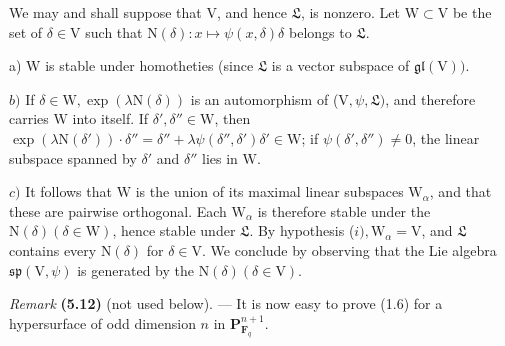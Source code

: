 \documentclass[10pt,leqno]{article}
\begin{document}
\par

\par

\noindent We may and shall suppose that \(\mathrm{V}\), and hence \(\mathfrak{L} \), is nonzero. Let \(\mathrm{W}\subset \mathrm{V}\) be the set of \(\delta \in \mathrm{V}\) such that \(\mathrm{N}(\delta ):x\longmapsto \psi (x,\delta )\delta \) belongs to \(\mathfrak{L} \).\par

\noindent a) \(\mathrm{W}\) is stable under homotheties (since \(\mathfrak{L} \) is a vector subspace of \(\mathfrak{gl}(\mathrm{V}))\).\par

\noindent \(b)\) If \(\delta \in \mathrm{W}, \operatorname{exp}(\lambda \mathrm{N}(\delta ))\) is an automorphism of (\(\mathrm{V},\psi ,\mathfrak{L} )\), and therefore carries \(\mathrm{W}\) into itself. If \(\delta ',\delta ''\in \mathrm{W}\), then \(\operatorname{exp}(\lambda \mathrm{N}(\delta '))\cdot \delta ''=\delta ''+\lambda \psi (\delta '',\delta ')\delta '\in \mathrm{W}\); if \(\psi (\delta ',\delta '')\ne 0\), the linear subspace spanned by \(\delta '\) and \(\delta ''\) lies in \(\mathrm{W}\).\par

\clearpage

\label{physical-23}\par\smallskip

\noindent \(c)\) It follows that \(\mathrm{W}\) is the union of its maximal linear subspaces \(\mathrm{W}_{\alpha }\), and that these are pairwise orthogonal. Each \(\mathrm{W}_{\alpha }\) is therefore stable under the \(\mathrm{N}(\delta ) (\delta \in \mathrm{W})\), hence stable under \(\mathfrak{L} \). By hypothesis (\(i), \mathrm{W}_{\alpha }=\mathrm{V}\), and \(\mathfrak{L} \) contains every \(\mathrm{N}(\delta )\) for \(\delta \in \mathrm{V}\). We conclude by observing that the Lie algebra \(\mathfrak{sp}(\mathrm{V},\psi )\) is generated by the \(\mathrm{N}(\delta ) (\delta \in \mathrm{V})\).\par

\noindent \emph{Remark} \textbf{(5.12)} (not used below). — It is now easy to prove (1.6) for a hypersurface of odd dimension \(n\) in \(\mathbf{P}^{n+1}_{\mathbf{F}_{q}}\).\par
\end{document}
